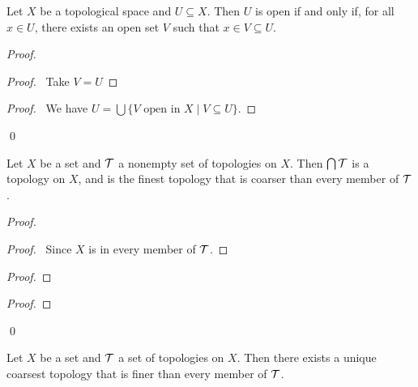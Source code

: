 \begin{lemma}
    \label{lemma:open}
    Let $X$ be a topological space and $U \subseteq X$. Then $U$ is open if and only if, for all $x \in U$,
    there exists an open set $V$ such that $x \in V \subseteq U$.
\end{lemma}

\begin{proof}
    \pf
    \begin{proof}
        \pf\ Take $V = U$
    \end{proof}
    \begin{proof}
        \pf\ We have $U = \bigcup \{ V \text{ open in } X \mid V \subseteq U \}$.
    \end{proof}
    \qed
\end{proof}

\begin{lemma}
    Let $X$ be a set and $\mathcal{T}$ a nonempty set of topologies on $X$. Then $\bigcap \mathcal{T}$ is a topology on $X$,
    and is the finest topology that is coarser than every member of $\mathcal{T}$.
\end{lemma}

\begin{proof}
    \pf
    \begin{proof}
        \pf\ Since $X$ is in every member of $\mathcal{T}$.
    \end{proof}
    \begin{proof}
    \end{proof}
    \begin{proof}
    \end{proof}
    \qed
\end{proof}

\begin{lemma}
    Let $X$ be a set and $\mathcal{T}$ a set of topologies on $X$. Then there exists a unique coarsest topology
    that is finer than every member of $\mathcal{T}$.
\end{lemma}

